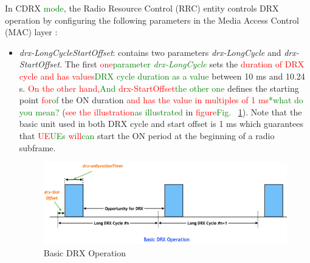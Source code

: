 \documentclass[]{IEEEtran}
\newcommand{\CAREPL}[2]{\textcolor{red}{#1}\textcolor{green}{#2}}
\begin{document}
    In CDRX \CAREPL{}{mode}, the Radio Resource Control (RRC) entity controls DRX operation by configuring the following parameters in the Media Access Control (MAC) layer \cite{3gpp_nr_nodate-3_38.331}:

\begin{itemize}
    \item \textit{drx-LongCycleStartOffset}: contains two parameters \textit{drx-LongCycle} and \textit{drx-StartOffset}. 
    The first \CAREPL{one}{parameter \textit{drx-LongCycle} } sets the \CAREPL{duration of DRX cycle and has values}{DRX cycle duration as a value} between 10 ms and 10.24 s. 
    \CAREPL{On the other hand,}{And} \CAREPL{drx-StartOffset}{the other one} defines the starting point \CAREPL{for}{of} the ON duration \CAREPL{and has the value in multiples of 1 ms}{*what do you mean?} (\CAREPL{see the illustration}{as illustrated} in \CAREPL{figure}{Fig.~} \ref{fig:basic-drx-operation}). 
    Note that the basic unit used in both DRX cycle and start offset is 1 ms which guarantees that \CAREPL{UE}{UEs} \CAREPL{will}{can} start the ON period at the beginning of a radio subframe.

\begin{figure}
    \centering
    \includegraphics[width=\linewidth]{Pictures/Basic DRX Operation.png}
    \caption{Basic DRX Operation}
    \label{fig:basic-drx-operation}
\end{figure}
    

\end{itemize}
\end{document}
